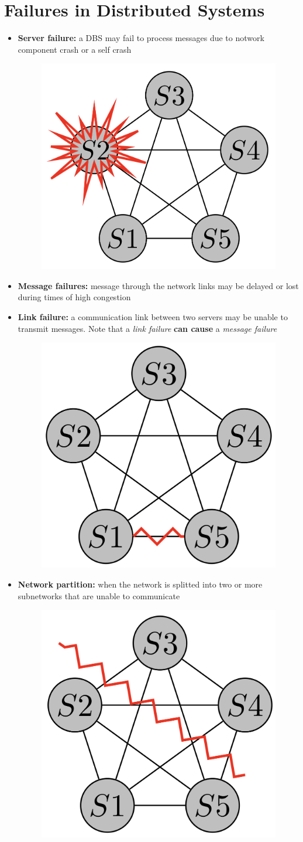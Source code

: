 \section{Failures in Distributed Systems}
\begin{itemize}
    \item \textbf{Server failure:} a DBS may fail to process messages due to notwork component crash or a self crash
    \begin{figure}[!h]
        \centering
        \includegraphics[width=0.2\linewidth]{images/AdvancedDataManagment/distributed_databases/server_failure.jpeg}
    \end{figure}
    
    \item \textbf{Message failures:} message through the network links may be delayed or lost during times of high congestion
    \item \textbf{Link failure:} a communication link between two servers may be unable to transmit messages. Note that a \textit{link failure} \textbf{can cause} a \textit{message failure}
    \begin{figure}[!h]
        \centering
        \includegraphics[width=0.2\linewidth]{images/AdvancedDataManagment/distributed_databases/link_failure.jpeg}
    \end{figure}
    \item \textbf{Network partition:} when the network is splitted into two or more subnetworks that are unable to communicate
    \begin{figure}[!h]
        \centering
        \includegraphics[width=0.2\linewidth]{images/AdvancedDataManagment/distributed_databases/network_partition.jpeg}
    \end{figure}
\end{itemize}

